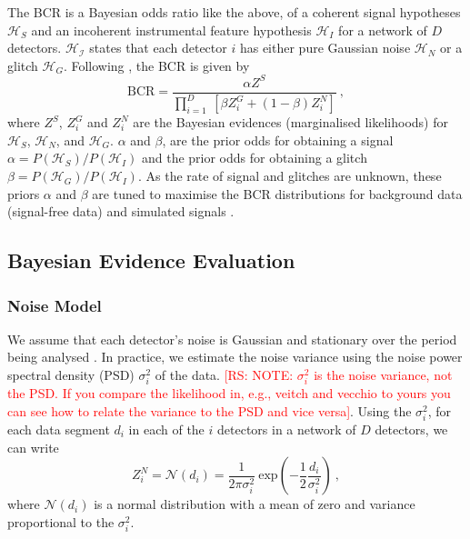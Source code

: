 \documentclass[%
preprint,
 amsmath,amssymb,
 aps,
]{revtex4}
\newcommand{\bcr}{{\sc BCR}\xspace}
\newcommand{\psd}{{\sc $\sigma^2_i$}\xspace}
\newcommand{\rs}[1]{\textcolor{red}{[RS: #1]}}
\begin{document}
The \bcr is a Bayesian odds ratio like the above, of a coherent signal hypotheses $\mathcal{H}_S$ and an incoherent instrumental feature hypothesis $\mathcal{H}_I$ for a network of $D$ detectors. $\mathcal{H_I}$ states that each detector $i$ has either pure Gaussian noise $\mathcal{H}_N$ or a glitch $\mathcal{H}_G$. Following \citet{BCR1}, the \bcr is given by
\begin{equation}
\label{eq:bcr}
\text{BCR} = \frac{\alpha Z^S}{\prod\limits^D_{i=1} \ [\beta Z^G_i + (1-\beta)Z^N_i]}\ ,
\end{equation}
where $Z^S$, $Z^G_i$ and $Z^N_i$ are the Bayesian evidences (marginalised likelihoods) for $\mathcal{H}_S$, $\mathcal{H}_N$, and $\mathcal{H}_G$. $\alpha$ and $\beta$, are the prior odds for obtaining a signal $\alpha=P(\mathcal{H}_S)/P(\mathcal{H}_I)$ and the prior odds for obtaining a glitch $\beta=P(\mathcal{H}_G)/P(\mathcal{H}_I)$. As the rate of signal and glitches are unknown, these priors $\alpha$ and $\beta$ are tuned to maximise the \bcr distributions for background data (signal-free data) and simulated signals \cite{BCR1}.  \\

\subsection{Bayesian Evidence Evaluation}
\subsubsection{Noise Model}
We assume that each detector's noise is Gaussian and stationary over the period being analysed \cite{ligo_psd}. In practice, we estimate the noise variance using the noise power spectral density (PSD)  \psd of the data. \rs{NOTE: $\sigma_i^2$ is the noise variance, not the PSD. If you compare the likelihood in, e.g., veitch and vecchio to yours you can see how to relate the variance to the PSD and vice versa}. Using the \psd, for each data segment $d_i$ in each of the $i$ detectors in a network of $D$ detectors, we can write 
\begin{equation}
\label{eq:zn}
Z^N_i = \mathcal{N}(d_i) = \frac{1}{2\pi \sigma^2_i} \ \text{exp}\left(-\frac{1}{2} \frac{d_i}{\sigma^2_i} \right) \ ,
\end{equation}
where $\mathcal{N}(d_i)$ is a normal distribution with a mean of zero and variance proportional to the \psd. 
\end{document}
